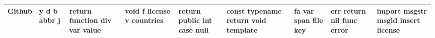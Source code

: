 \documentclass[11pt,a4paper]{article}
\begin{document}
\begin{appendices}
\begin{table}[htp]
\begin{tiny}
\begin{tabular}{|p{}|p{}|p{}|p{}|p{}|p{}|p{}|p{}|p{}|}
Github & y \newline d \newline b \newline abbr \newline j & return \newline function \newline div \newline var \newline value & void \newline f \newline license \newline v \newline countries & return \newline public \newline int \newline case \newline null & const \newline typename \newline return \newline void \newline template & fa \newline var \newline span \newline file \newline key & err \newline return \newline nil \newline func \newline error & import \newline msgstr \newline msgid \newline insert \newline license\\\hline

\end{tabular}
\end{tiny}
\end{table}
\end{appendices}
\end{document}
